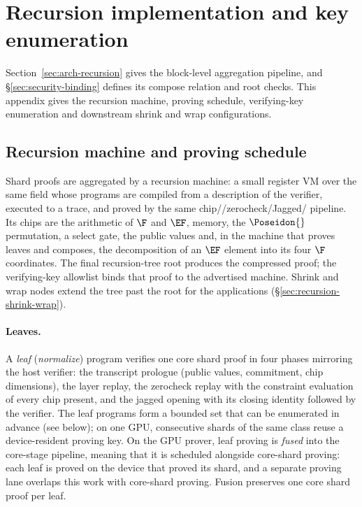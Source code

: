 \section{Recursion implementation and key enumeration}
\label{sec:app-recursion}

Section~\ref{sec:arch-recursion} gives the block-level aggregation pipeline, and \S\ref{sec:security-binding} defines its compose relation and root checks. This appendix gives the recursion machine, proving schedule, verifying-key enumeration and downstream shrink and wrap configurations.

\subsection{Recursion machine and proving schedule}

Shard proofs are aggregated by a recursion machine: a small register VM over the same field whose programs are compiled from a description of the verifier, executed to a trace, and proved by the same chip/\LogUp{}/zerocheck/Jagged/\WHIR{} pipeline. Its chips are the arithmetic of $\F$ and $\EF$, memory, the $\Poseidon{}$ permutation, a select gate, the public values and, in the machine that proves leaves and composes, the decomposition of an $\EF$ element into its four $\F$ coordinates. The final recursion-tree root produces the compressed proof; the verifying-key allowlist binds that proof to the advertised machine. Shrink and wrap nodes extend the tree past the root for the applications (\S\ref{sec:recursion-shrink-wrap}).

\paragraph{Leaves.} A \emph{leaf} (\emph{normalize}) program verifies one core shard proof in four phases mirroring the host verifier: the transcript prologue (public values, commitment, chip dimensions), the \LogUp{} layer replay, the zerocheck replay with the constraint evaluation of every chip present, and the jagged opening with its closing identity followed by the \WHIR{} verifier. The leaf programs form a bounded set that can be enumerated in advance (see below); on one GPU, consecutive shards of the same class reuse a device-resident proving key. On the GPU prover, leaf proving is \emph{fused} into the core-stage pipeline, meaning that it is scheduled alongside core-shard proving: each leaf is proved on the device that proved its shard, and a separate proving lane overlaps this work with core-shard proving. Fusion preserves one core shard proof per leaf.

